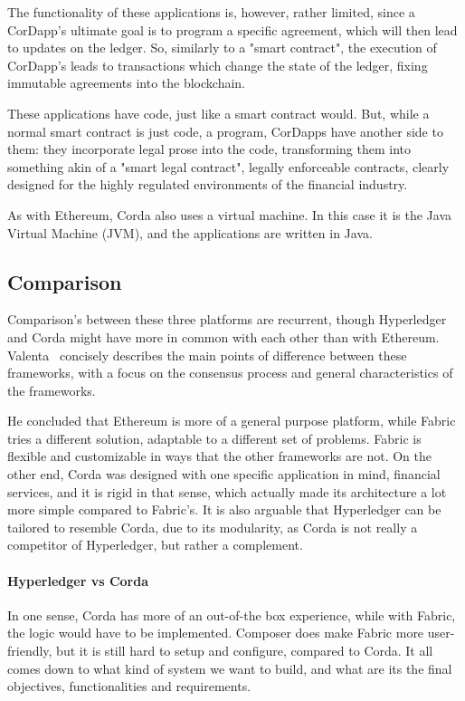 The functionality of these applications is, however, rather limited, since a CorDapp's ultimate goal is to program a specific agreement, which will then lead to updates on the ledger. So, similarly to a "smart contract", the execution of CorDapp's leads to transactions which change the state of the ledger, fixing immutable agreements into the blockchain.

These applications have code, just like a smart contract would. But, while a normal smart contract is just code, a program, CorDapps have another side to them: they incorporate legal prose into the code, transforming them into something akin of a "smart legal contract", legally enforceable contracts, clearly designed for the highly regulated environments of the financial industry.

As with Ethereum, Corda also uses a virtual machine. In this case it is the Java Virtual Machine (JVM), and the applications are written in Java.


\subsection{Comparison}
Comparison's between these three platforms are recurrent, though Hyperledger and Corda might have more in common with each other than with Ethereum. 
Valenta~\cite{Valenta2017} concisely describes the main points of difference between these frameworks, with a focus on the consensus process and general characteristics of the frameworks. 

He concluded that Ethereum is more of a general purpose platform, while Fabric tries a different solution, adaptable to a different set of problems. Fabric is flexible and customizable in ways that the other frameworks are not. On the other end, Corda  was designed with one specific application in mind, financial services, and it is rigid in that sense, which actually made its architecture a lot more simple compared to Fabric's. It is also arguable that Hyperledger can be tailored to resemble Corda, due to its modularity, as Corda is not really a competitor of Hyperledger, but rather a complement. 

\paragraph{Hyperledger vs Corda} In one sense, Corda has more of an out-of-the box experience, while with Fabric, the logic would have to be implemented. Composer does make Fabric more user-friendly, but it is still hard to setup and configure, compared to Corda. It all comes down to what kind of system we want to build, and what are its the final objectives, functionalities and requirements.


